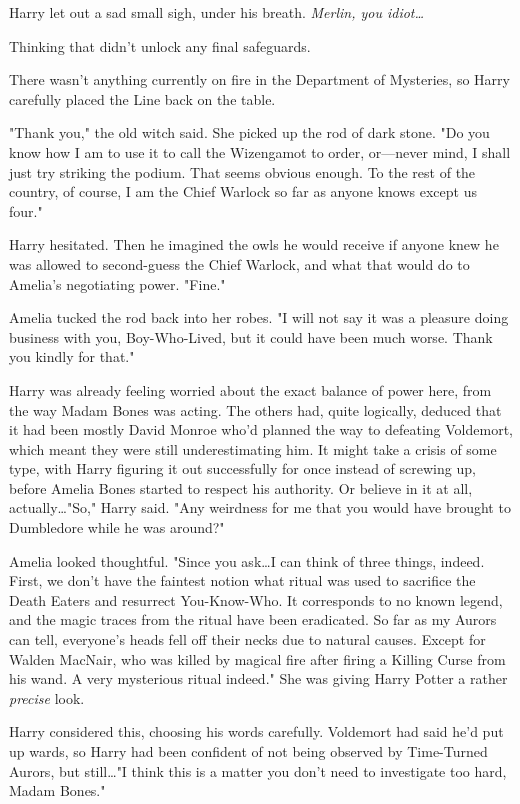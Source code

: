 Harry let out a sad small sigh, under his breath. \emph{Merlin, you
idiot…}

Thinking that didn't unlock any final safeguards.

There wasn't anything currently on fire in the Department of Mysteries, so
Harry carefully placed the Line back on the table.

"Thank you," the old witch said. She picked up the rod of dark stone. "Do you
know how I am to use it to call the Wizengamot to order, or---never mind, I
shall just try striking the podium. That seems obvious enough. To the rest of
the country, of course, I am the Chief Warlock so far as anyone knows except us
four."

Harry hesitated. Then he imagined the owls he would receive if anyone knew he
was allowed to second-guess the Chief Warlock, and what that would do to
Amelia's negotiating power. "Fine."

Amelia tucked the rod back into her robes. "I will not say it was a pleasure
doing business with you, Boy-Who-Lived, but it could have been much worse.
Thank you kindly for that."

Harry was already feeling worried about the exact balance of power here, from
the way Madam Bones was acting. The others had, quite logically, deduced that
it had been mostly David Monroe who'd planned the way to defeating Voldemort,
which meant they were still underestimating him. It might take a crisis of some
type, with Harry figuring it out successfully for once instead of screwing up,
before Amelia Bones started to respect his authority. Or believe in it at all,
actually…"So," Harry said. "Any weirdness for me that you would have
brought to Dumbledore while he was around?"

Amelia looked thoughtful. "Since you ask…I can think of three things,
indeed. First, we don't have the faintest notion what ritual was used to
sacrifice the Death Eaters and resurrect You-Know-Who. It corresponds to no
known legend, and the magic traces from the ritual have been eradicated. So far
as my Aurors can tell, everyone's heads fell off their necks due to natural
causes. Except for Walden MacNair, who was killed by magical fire after firing
a Killing Curse from his wand. A very mysterious ritual indeed." She was giving
Harry Potter a rather \emph{precise} look.

Harry considered this, choosing his words carefully. Voldemort had said he'd
put up wards, so Harry had been confident of not being observed by Time-Turned
Aurors, but still…"I think this is a matter you don't need to
investigate too hard, Madam Bones."


